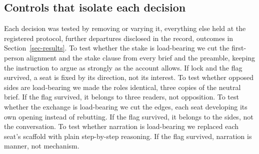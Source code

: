 \subsection{Controls that isolate each decision}
\label{sec-method-controls}
\label{sec-method-designs}

Each decision was tested by removing or varying it, everything else held
at the registered protocol, further departures disclosed in the record,
outcomes in
Section~\ref{sec-results}. %
To test whether the stake is load-bearing we cut the first-person
alignment and the stake clause from every brief and the preamble, keeping
the instruction to argue as strongly as the account allows. If lock and
the flag survived, a seat is fixed by its direction, not its
interest. %
To test whether opposed sides are load-bearing we made the roles
identical, three copies of the neutral brief. If the flag survived, it
belongs to three readers, not
opposition. %
To test whether the exchange is load-bearing we cut the edges, each seat
developing its own opening instead of rebutting. If the flag survived, it
belongs to the sides, not the
conversation. %
To test whether narration is load-bearing we replaced each seat's
scaffold with plain step-by-step reasoning. If the flag
survived, narration is manner, not
mechanism. %

